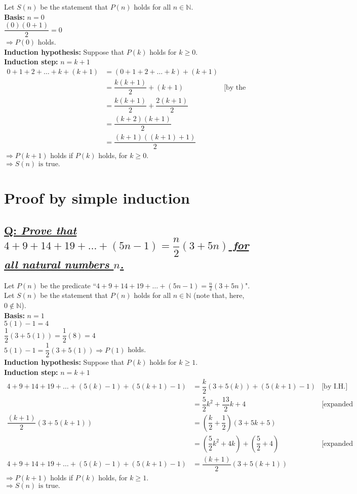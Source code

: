 \documentclass{article}
\begin{document}
Let $S(n)$ be the statement that $P(n)$ holds for all $n\in\mathbb{N}$.\\[1ex]
\textbf{Basis:} $n=0$\\[1ex]
$\dfrac{(0)(0+1)}{2}=0$\\[1ex]
$\Rightarrow P(0)$ holds.\\[1ex]
\textbf{Induction hypothesis:} Suppose that $P(k)$ holds for $k\geq 0$.\\[1ex]
\textbf{Induction step:} $n=k+1$
\begin{align*}
0+1+2+\ldots+k+(k+1)& =(0+1+2+\ldots+k)+(k+1)\\
& =\dfrac{k(k+1)}{2}+(k+1)& \text{[by the induction hypothesis]}\\
& =\dfrac{k(k+1)}{2}+\dfrac{2(k+1)}{2}\\
& =\dfrac{(k+2)(k+1)}{2}\\
& =\dfrac{(k+1)((k+1)+1)}{2}
\end{align*}
$\Rightarrow P(k+1)$ holds if $P(k)$ holds, for $k\geq 0$.\\[1ex]
$\boxed{\Rightarrow S(n)\text{ is true.}}$

\section{\sc Proof by simple induction}

\subsection*{\href{http://www.youtube.com/watch?v=IFqna5F0kW8}{Q: {\em Prove that $4+9+14+19+\ldots+(5n-1)=\dfrac{n}{2}(3+5n)$ for all natural numbers $n$.}}}

Let $P(n)$ be the predicate ``$4+9+14+19+\ldots+(5n-1)=\tfrac{n}{2}(3+5n)$".\\
Let $S(n)$ be the statement that $P(n)$ holds for all $n\in\mathbb{N}$ (note that, here, $0\notin\mathbb{N}$).\\[1ex]
\textbf{Basis:} $n=1$\\[1ex]
$5(1)-1=4$\\[1ex]
$\dfrac{1}{2}(3+5(1))=\dfrac{1}{2}(8)=4$\\[1ex]
$5(1)-1=\dfrac{1}{2}(3+5(1))\Rightarrow P(1)$ holds.\\[1ex]
\textbf{Induction hypothesis:} Suppose that $P(k)$ holds for $k\geq 1$.\\[1ex]
\textbf{Induction step:} $n=k+1$
\begin{align*}
4+9+14+19+\ldots+(5(k)-1)+(5(k+1)-1)& =\dfrac{k}{2}(3+5(k))+(5(k+1)-1)& \text{[by I.H.]}\\
& =\dfrac{5}{2}k^2+\dfrac{13}{2}k+4& \text{[expanded and simplified]}\\
\dfrac{(k+1)}{2}(3+5(k+1))& =\left(\dfrac{k}{2}+\dfrac{1}{2}\right)(3+5k+5)\\
& =(\dfrac{5}{2}k^2+4k)+(\dfrac{5}{2}+4)& \text{[expanded and simplified]}\\
4+9+14+19+\ldots+(5(k)-1)+(5(k+1)-1)& =\dfrac{(k+1)}{2}(3+5(k+1))
\end{align*}
$\Rightarrow P(k+1)$ holds if $P(k)$ holds, for $k\geq 1$.\\[1ex]
$\boxed{\Rightarrow S(n)\text{ is true.}}$
\end{document}
